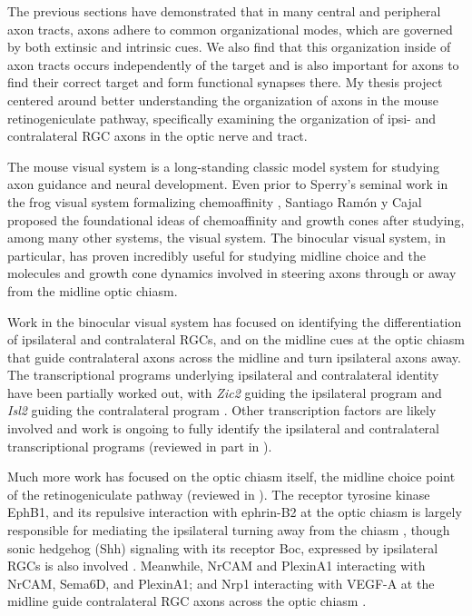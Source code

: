 The previous sections have demonstrated that in many central and peripheral axon tracts, axons adhere to common organizational modes, which are governed by both extinsic and intrinsic cues.
We also find that this organization inside of axon tracts occurs independently of the target and is also important for axons to find their correct target and form functional synapses there.
My thesis project centered around better understanding the organization of axons in the mouse retinogeniculate pathway, specifically examining the organization of ipsi- and contralateral RGC axons in the optic nerve and tract.

The mouse visual system is a long-standing classic model system for studying axon guidance and neural development.
Even prior to Sperry's seminal work in the frog visual system formalizing chemoaffinity \cite{sperry1963chemoaffinity}, Santiago Ram\'on y Cajal proposed the foundational ideas of chemoaffinity and growth cones after studying, among many other systems, the visual system.
The binocular visual system, in particular, has proven incredibly useful for studying midline choice and the molecules and growth cone dynamics involved in steering axons through or away from the midline optic chiasm.

Work in the binocular visual system has focused on identifying the differentiation of ipsilateral and contralateral RGCs, and on the midline cues at the optic chiasm that guide contralateral axons across the midline and turn ipsilateral axons away.
The transcriptional programs underlying ipsilateral and contralateral identity have been partially worked out, with \emph{Zic2} guiding the ipsilateral program and \emph{Isl2} guiding the contralateral program \cite{herrera2003zic2,garcia2008zic2,pak2004magnitude}.
Other transcription factors are likely involved and work is ongoing to fully identify the ipsilateral and contralateral transcriptional programs (reviewed in part in \cite{erskine2014connecting}).

Much more work has focused on the optic chiasm itself, the midline choice point of the retinogeniculate pathway (reviewed in \cite{erskine2014connecting,petros2008retinal}).
The receptor tyrosine kinase EphB1, and its repulsive interaction with ephrin-B2 at the optic chiasm is largely responsible for mediating the ipsilateral turning away from the chiasm \cite{nakagawa2000ephrin,williams2003ephrin,petros2009specificity}, though sonic hedgehog (Shh) signaling with its receptor Boc, expressed by ipsilateral RGCs is also involved \cite{fabre2010segregation}.
Meanwhile, NrCAM and PlexinA1 interacting with NrCAM, Sema6D, and PlexinA1; and Nrp1 interacting with VEGF-A at the midline guide contralateral RGC axons across the optic chiasm \cite{williams2006role,kuwajima2012optic,erskine2011vegf}.

